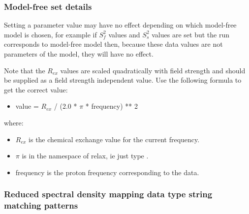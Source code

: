 \subsubsection{Model-free set details}

Setting a parameter value may have no effect depending on which model-free model is chosen,
for example if $S^2_f$ values and $S^2_s$ values are set but the run corresponds to model-free model
 then, because these data values are not parameters of the model, they will have no
effect.

Note that the $R_{ex}$ values are scaled quadratically with field strength and should be supplied
as a field strength independent value.  Use the following formula to get the correct value:

\begin{itemize}
\item[]     value = $R_{ex}$ / (2.0 * $\pi$ * frequency) ** 2
\end{itemize}

where:
\begin{itemize}
\item[]     $R_{ex}$ is the chemical exchange  value for the current frequency.
\item[]     $\pi$ is in the namespace of relax, ie just type 
.
\item[]     frequency is the proton frequency corresponding to the data.
\end{itemize}



\subsubsection{Reduced spectral density mapping data type string matching patterns}



